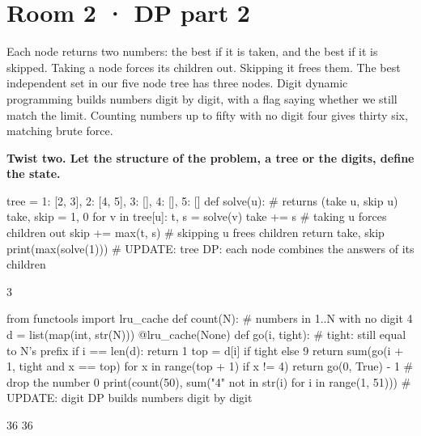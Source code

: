 \documentclass[11pt,a4paper]{report}
\begin{document}
\section*{Room 2 · DP part 2}
Each node returns two numbers: the best if it is taken, and the best if it is skipped. Taking a node forces its children out. Skipping it frees them. The best independent set in our five node tree has three nodes. Digit dynamic programming builds numbers digit by digit, with a flag saying whether we still match the limit. Counting numbers up to fifty with no digit four gives thirty six, matching brute force.
\begin{tcolorbox}[colback=yellow!12,colframe=orange!70!black,boxrule=0.4pt,left=4pt,right=4pt,top=2pt,bottom=2pt]\textbf{Twist two. Let the structure of the problem, a tree or the digits, define the state.}\end{tcolorbox}
\begin{Code}
tree = {1: [2, 3], 2: [4, 5], 3: [], 4: [], 5: []}
def solve(u):                               # returns (take u, skip u)
    take, skip = 1, 0
    for v in tree[u]:
        t, s = solve(v)
        take += s                           # taking u forces children out
        skip += max(t, s)                   # skipping u frees children
    return take, skip
print(max(solve(1)))
# UPDATE: tree DP: each node combines the answers of its children
\end{Code}
\begin{Out}
3
\end{Out}
\begin{Code}
from functools import lru_cache
def count(N):                               # numbers in 1..N with no digit 4
    d = list(map(int, str(N)))
    @lru_cache(None)
    def go(i, tight):                       # tight: still equal to N's prefix
        if i == len(d): return 1
        top = d[i] if tight else 9
        return sum(go(i + 1, tight and x == top) for x in range(top + 1) if x != 4)
    return go(0, True) - 1                  # drop the number 0
print(count(50), sum("4" not in str(i) for i in range(1, 51)))
# UPDATE: digit DP builds numbers digit by digit
\end{Code}
\begin{Out}
36 36
\end{Out}
\end{document}

